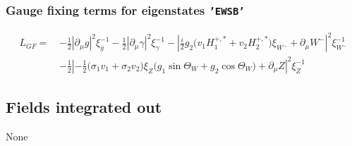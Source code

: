\subsubsection{Gauge fixing terms for eigenstates {\tt 'EWSB'} } 
\begin{align} 
L_{GF} = \, &-\frac{1}{2} |\partial_{\mu}g|^2 \xi_{g}^{-1} -\frac{1}{2} |\partial_{\mu}\gamma|^2 \xi_{\gamma}^{-1} - |\frac{i}{2} g_2 \Big(v_1 H_1^{+,*}  + v_2 H_2^{+,*} \Big)\xi_{W^-}  + \partial_{\mu}W^-|^2 \xi_{W^-}^{-1} \nonumber \\ 
 &-\frac{1}{2} |-\frac{1}{2} \Big(\sigma_1 v_1  + \sigma_2 v_2 \Big)\xi_{Z} \Big(g_1 \sin\Theta_W   + g_2 \cos\Theta_W  \Big) + \partial_{\mu}Z|^2 \xi_{Z}^{-1} 
\end{align} 
\subsection{Fields integrated out} 
None 
